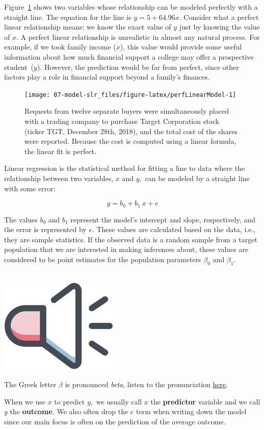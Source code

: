 \documentclass[
  10pt,
  openany]{book}
\newenvironment{mdframedwithfootTipDataPro}
{   
    \savenotes
    \begin{mdframed}[%
    topline=true, bottomline=true, linecolor=oiGray, linewidth=0.5pt,
    rightline=false, leftline=false,
    backgroundcolor=oiLGray]
    \renewcommand{\thempfootnote}{\arabic{footnote}}
    }
{
    \end{mdframed}
    \spewnotes
}
\newenvironment{pronunciation}{
\vspace{4mm}
\begin{mdframedwithfootTipDataPro}
\begin{minipage}[t]{0.10\textwidth}
{$\:$ \\ \setkeys{Gin}{width=2em,keepaspectratio}\includegraphics{images/_icons/pronunciation.png}}
\end{minipage}
\hfill
\begin{minipage}[t]{0.90\textwidth}
\vspace{-2mm}
\setlength{\parskip}{1em}
}{\end{minipage}
\end{mdframedwithfootTipDataPro}
\vspace{4mm}
}
\begin{document}
Figure~\ref{fig:perfLinearModel} shows two variables whose relationship can be modeled perfectly with a straight line.
The equation for the line is \(y = 5 + 64.96 x.\) Consider what a perfect linear relationship means: we know the exact value of \(y\) just by knowing the value of \(x.\) A perfect linear relationship is unrealistic in almost any natural process.
For example, if we took family income (\(x\)), this value would provide some useful information about how much financial support a college may offer a prospective student~(\(y\)).
However, the prediction would be far from perfect, since other factors play a role in financial support beyond a family's finances.

\begin{figure}[h]

{\centering \texttt{[image: 07-model-slr\_files/figure-latex/perfLinearModel-1]} 

}

\caption{Requests from twelve separate buyers were simultaneously placed with a trading company to purchase Target Corporation stock (ticker TGT, December 28th, 2018), and the total cost of the shares were reported. Because the cost is computed using a linear formula, the linear fit is perfect.}\label{fig:perfLinearModel}
\end{figure}

Linear regression is the statistical method for fitting a line to data where the relationship between two variables, \(x\) and \(y,\) can be modeled by a straight line with some error:

\[ y = b_0 + b_1 \ x + e\]

The values \(b_0\) and \(b_1\) represent the model's intercept and slope, respectively, and the error is represented by \(e\).
These values are calculated based on the data, i.e., they are sample statistics.
If the observed data is a random sample from a target population that we are interested in making inferences about, these values are considered to be point estimates for the population parameters \(\beta_0\) and \(\beta_1\).

\begin{pronunciation}
The Greek letter \(\beta\) is pronounced \emph{beta}, listen to the pronunciation \href{https://youtu.be/PStgY5AcEIw?t=7}{here}.

\end{pronunciation}

When we use \(x\) to predict \(y,\) we usually call \(x\) the \textbf{predictor} variable and we call \(y\) the \textbf{outcome}.
We also often drop the \(e\) term when writing down the model since our main focus is often on the prediction of the average outcome.
\end{document}
